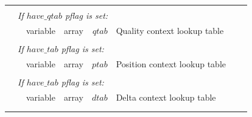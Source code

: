 \documentclass[a4paper]{article}
\begin{document}
\begin{table}[H]
\begin{tabular}{|r|r|r|r|r|p{8cm}|l|l|}
& \multicolumn{6}{l|}{} & \\[-0.5em]
\multicolumn{1}{|l|}{} & \multicolumn{6}{l|}{ \textit{If $have\_qtab$ pflag is set:} } & \\
\cline{3-6}
                       &  & variable                   & array          & $qtab$                         & Quality context lookup table & & \\
\cline{3-6}

& \multicolumn{6}{l|}{} & \\[-0.5em]
\multicolumn{1}{|l|}{} & \multicolumn{6}{l|}{ \textit{If $have\_tab$ pflag is set:} } & \\
\cline{3-6}
                       &  & variable                   & array          & $ptab$                         & Position context lookup table & & \\
\cline{3-6}

& \multicolumn{6}{l|}{} & \\[-0.5em]
\multicolumn{1}{|l|}{} & \multicolumn{6}{l|}{ \textit{If $have\_tab$ pflag is set:} } & \\
\cline{3-6}
                       &  & variable                   & array          & $dtab$                         & Delta context lookup table & & \\
\cline{3-6}
& \multicolumn{6}{l|}{} & \\
\cline{2-7}
\multicolumn{8}{|l|}{}\\
\hline
\end{tabular}
\end{table}

%
%
%
%
\end{document}
